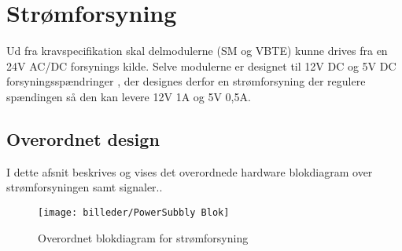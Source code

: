 \chapter{Strømforsyning}
Ud fra kravspecifikation skal delmodulerne (SM og VBTE) kunne drives fra en 24V AC/DC forsynings kilde. Selve modulerne er designet til 12V DC og 5V DC forsyningsspændringer , der designes derfor en strømforsyning der regulere spændingen så den kan levere 12V 1A og 5V 0,5A.  

\section{Overordnet design}
I dette afsnit beskrives og vises det overordnede hardware blokdiagram over strømforsyningen samt signaler..

\begin{figure}[H]
\centering
\texttt{[image: billeder/PowerSubbly Blok]}
\caption{Overordnet blokdiagram for strømforsyning}
\label{fig:PowerSubbly Blok}
\end{figure}